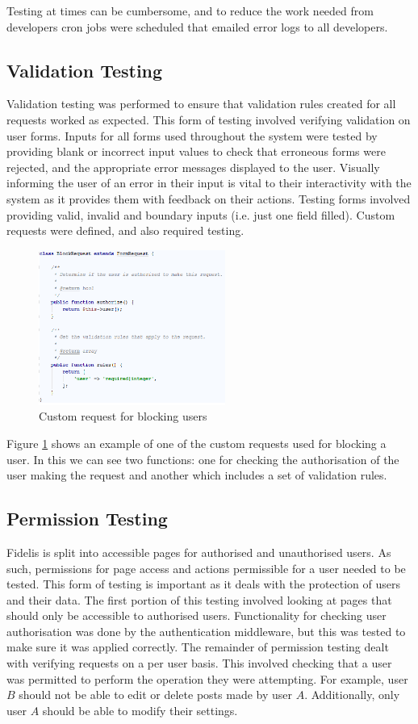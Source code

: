 Testing at times can be cumbersome, and to reduce the work needed from developers cron jobs were scheduled that emailed error logs to all developers. 

\subsection{Validation Testing}
Validation testing was performed to ensure that validation rules created for all requests worked as expected. This form of testing involved verifying validation on user forms. Inputs for all forms used throughout the system were tested by providing blank or incorrect input values to check that erroneous forms were rejected, and the appropriate error messages displayed to the user. Visually informing the user of an error in their input is vital to their interactivity with the system as it provides them with feedback on their actions. Testing forms involved providing valid, invalid and boundary inputs (i.e. just one field filled). Custom requests were defined, and also required testing.

\begin{figure}[H]
\centering
\includegraphics[height=2in]{Images/Testing/BlockRequest}
\caption{Custom request for blocking users}
\label{fig:BlockRequest}
\end{figure}

Figure \ref{fig:BlockRequest} shows an example of one of the custom requests used for blocking a user. In this we can see two functions: one for checking the authorisation of the user making the request and another which includes a set of validation rules. 

\subsection{Permission Testing}
Fidelis is split into accessible pages for authorised and unauthorised users. As such, permissions for page access and actions permissible for a user needed to be tested. This form of testing is important as it deals with the protection of users and their data. The first portion of this testing involved looking at pages that should only be accessible to authorised users. Functionality for checking user authorisation was done by the authentication middleware, but this was tested to make sure it was applied correctly. The remainder of permission testing dealt with verifying requests on a per user basis. This involved checking that a user was permitted to perform the operation they were attempting. For example, user $B$ should not be able to edit or delete posts made by user $A$. Additionally, only user $A$ should be able to modify their settings.

